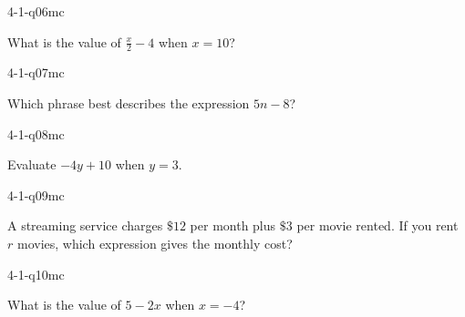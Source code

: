\begin{practiceQuestion}{4-1-q06}{mc}
\begin{questionText}
What is the value of $\frac{x}{2} - 4$ when $x = 10$?
\end{questionText}
\end{practiceQuestion}

\begin{practiceQuestion}{4-1-q07}{mc}
\begin{questionText}
Which phrase best describes the expression $5n - 8$?
\end{questionText}
\end{practiceQuestion}

\begin{practiceQuestion}{4-1-q08}{mc}
\begin{questionText}
Evaluate $-4y + 10$ when $y = 3$.
\end{questionText}
\end{practiceQuestion}

\begin{practiceQuestion}{4-1-q09}{mc}
\begin{questionText}
A streaming service charges $\$12$ per month plus $\$3$ per movie rented. If you rent $r$ movies, which expression gives the monthly cost?
\end{questionText}
\end{practiceQuestion}

\begin{practiceQuestion}{4-1-q10}{mc}
\begin{questionText}
What is the value of $5 - 2x$ when $x = -4$?
\end{questionText}
\end{practiceQuestion}

